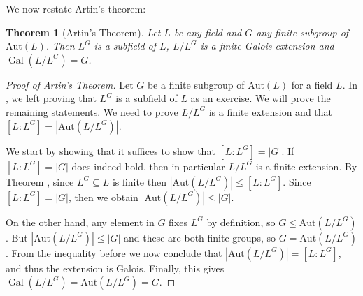 \documentclass[12pt]{report}
\newtheorem*{theorem*}{Theorem}
\numberwithin{equation}{section}
\numberwithin{theorem}{chapter}
\theoremstyle{definition}
\newtheorem*{basic properties}{Basic Properties}
\newtheorem*{Important Remark}{Important Remark}
\DeclareMathOperator{\Gal}{Gal}
\begin{document}
We now restate Artin's theorem:

\begin{theorem*}[Artin's Theorem]
Let $L$ be any field and $G$ any finite subgroup of $\mathrm{Aut}(L)$. Then $L^G$ is a subfield of $L$, $L/L^G$ is a finite Galois extension and $\Gal(L/L^G) = G$.
\end{theorem*}



\begin{proof}[Proof of Artin's Theorem] 
Let $G$ be a finite subgroup of $\mathrm{Aut}(L)$ for a field $L$. In , we left proving that $L^G$ is a subfield of $L$ as an exercise. We will prove the remaining statements. We need to prove $L/L^G$ is a finite extension and that $[L:L^G] = |\mathrm{Aut}(L/L^G)|$.

We start by showing that it suffices to show that $[L: L^G] = |G|$. If $[L: L^G] = |G|$ does indeed hold, then in particular $L/L^G$ is a finite extension. By Theorem , since $L^G \subseteq L$ is finite then $|\mathrm{Aut}(L/L^G)| \leqslant [L:L^G]$. Since $[L: L^G] = |G|$, then we obtain $|\mathrm{Aut}(L/L^G)| \leqslant |G|$.

On the other hand, any element in $G$ fixes $L^G$ by definition, so $G \leq \mathrm{Aut}(L/L^G)$. But $|\mathrm{Aut}(L/L^G)| \leqslant |G|$ and these are both finite groups, so $G = \mathrm{Aut}(L/L^G)$. From the inequality before we now conclude that $|\mathrm{Aut}(L/L^G)| = [L:L^G]$, and thus the extension is Galois. Finally, this gives $\Gal(L/L^G) = \mathrm{Aut}(L/L^G) = G$.



\end{proof}
\end{document}
